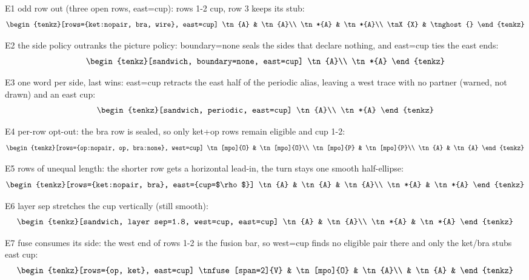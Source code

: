 \documentclass[varwidth=19cm, border=6pt]{standalone}
\begin{document}
E1 odd row out (three open rows, east=cup): rows 1-2 cup, row 3 keeps
its stub:
\[
  \begin{tenkz}[rows={ket:nopair, bra, wire}, east=cup]
    \tn{A} & \tn{A}\\
    \tn*{A} & \tn*{A}\\
    \tnX{X} & \tnghost{}
  \end{tenkz}
\]

E2 the side policy outranks the picture policy: boundary=none seals the
sides that declare nothing, and east=cup ties the east ends:
\[
  \begin{tenkz}[sandwich, boundary=none, east=cup]
    \tn{A}\\
    \tn*{A}
  \end{tenkz}
\]

E3 one word per side, last wins: east=cup retracts the east half of the
periodic alias, leaving a west trace with no partner (warned, not drawn)
and an east cup:
\[
  \begin{tenkz}[sandwich, periodic, east=cup]
    \tn{A}\\
    \tn*{A}
  \end{tenkz}
\]

E4 per-row opt-out: the bra row is sealed, so only ket+op rows remain
eligible and cup 1-2:
\[
  \begin{tenkz}[rows={op:nopair, op, bra:none}, west=cup]
    \tn[mpo]{O} & \tn[mpo]{O}\\
    \tn[mpo]{P} & \tn[mpo]{P}\\
    \tn{A} & \tn{A}
  \end{tenkz}
\]

E5 rows of unequal length: the shorter row gets a horizontal lead-in, the
turn stays one smooth half-ellipse:
\[
  \begin{tenkz}[rows={ket:nopair, bra}, east={cup=$\rho$}]
    \tn{A} & \tn{A} & \tn{A}\\
    \tn*{A} & \tn*{A}
  \end{tenkz}
\]

E6 layer sep stretches the cup vertically (still smooth):
\[
  \begin{tenkz}[sandwich, layer sep=1.8, west=cup, east=cup]
    \tn{A} & \tn{A}\\
    \tn*{A} & \tn*{A}
  \end{tenkz}
\]

E7 fuse consumes its side: the west end of rows 1-2 is the fusion bar, so
west=cup finds no eligible pair there and only the ket/bra stubs east
cup:
\[
  \begin{tenkz}[rows={op, ket}, east=cup]
    \tnfuse[span=2]{V} & \tn[mpo]{O} & \tn{A}\\
                       & \tn{A} &
  \end{tenkz}
\]
\end{document}
